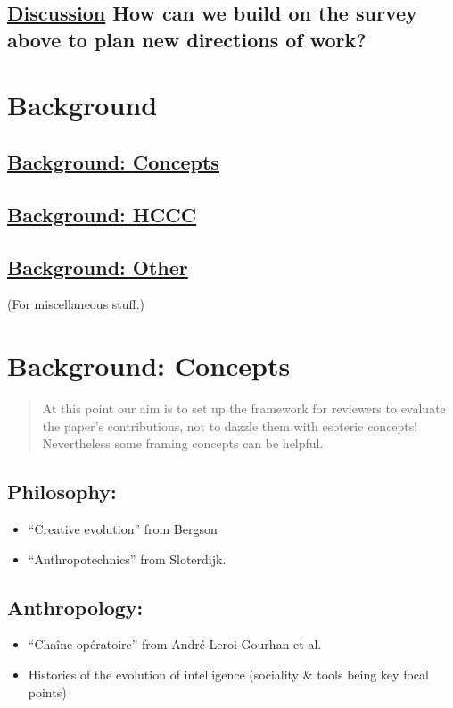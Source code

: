 \documentclass[11pt]{article}
\begin{document}
\subsection{\hyperref[sec:orgb1f7b9a]{Discussion} How can we build on the survey above to plan new directions of work?}
\label{sec:org5a151e9}
\section{Background}
\label{sec:org71daf48}
\subsection{\hyperref[sec:org1164c4f]{Background: Concepts}}
\label{sec:org3ba4eb5}
\subsection{\hyperref[sec:org2aca6e0]{Background: HCCC}}
\label{sec:org1162a31}
\subsection{\hyperref[sec:orgaefd206]{Background: Other}}
\label{sec:org61f7f33}
(For miscellaneous stuff.)
\section{Background: Concepts}
\label{sec:org1164c4f}
\begin{quote}
At this point our aim is to set up the framework for reviewers to
evaluate the paper’s contributions, not to dazzle them with esoteric
concepts!  Nevertheless some framing concepts can be helpful.
\end{quote}

\subsection{Philosophy:}
\label{sec:org72ee4ef}
\begin{itemize}
\item “Creative evolution” from Bergson
\item “Anthropotechnics” from Sloterdijk.
\end{itemize}
\subsection{Anthropology:}
\label{sec:orgbbe6abf}
\begin{itemize}
\item “Chaîne opératoire” from André Leroi-Gourhan et al.
\item Histories of the evolution of intelligence (sociality \& tools being key focal points)
\end{itemize}
\end{document}
